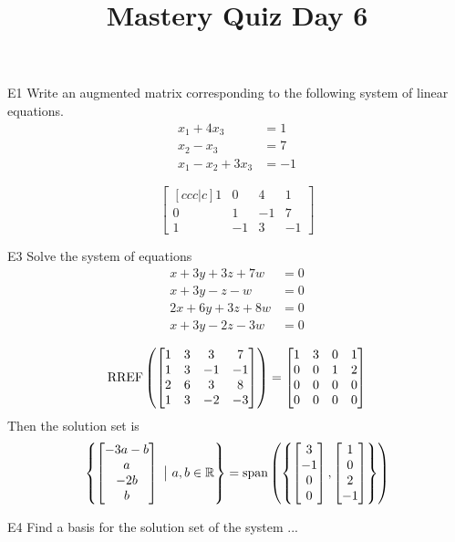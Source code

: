 \documentclass{sbgLAquiz}
\title{Mastery Quiz Day 6 }
\begin{document}
\begin{problem}{E1}
Write an augmented matrix corresponding to the following system of linear equations.
\begin{align*}
x_1+4x_3 &= 1 \\
x_2-x_3 &= 7 \\
x_1-x_2+3x_3 &= -1
\end{align*}
\end{problem}
\begin{solution}
$$\begin{bmatrix}[ccc|c]
1 & 0 & 4 & 1 \\
0 & 1 & -1 & 7 \\
1 & -1 & 3 & -1
\end{bmatrix}$$
\end{solution}

\begin{problem}{E3} 
Solve the system of equations
\begin{align*}
x+3y+3z+7w &= 0 \\
 x+3y-z-w &= 0 \\
  2x+6y+3z+8w &= 0 \\
   x+3y-2z-3w &= 0
\end{align*}
\end{problem}

\begin{solution}
$$\operatorname{RREF}\left(\begin{bmatrix} 1 & 3 & 3 & 7 \\ 1 & 3 & -1 & -1 \\ 2 & 6 & 3 & 8 \\ 1 & 3 & -2 & -3 \end{bmatrix}\right) = \begin{bmatrix} 1 & 3 & 0 & 1 \\ 0 & 0 & 1 & 2 \\ 0 & 0 & 0 & 0 \\ 0 & 0 & 0 & 0 \end{bmatrix}$$
Then the solution set is 
$$\left\{ \begin{bmatrix} -3a-b \\ a \\ -2b \\ b \end{bmatrix}\ \big|\ a,b \in \mathbb{R}\right\} = {\rm span}\left(\left\{ \begin{bmatrix} 3 \\ -1 \\ 0 \\ 0 \end{bmatrix} , \begin{bmatrix} 1\\0 \\ 2 \\ -1 \end{bmatrix} \right\} \right)$$
\end{solution}

\begin{extract}\newpage\end{extract}
\begin{problem}{E4}
Find a basis for the solution set of the system ...
\end{problem}
\end{document}
